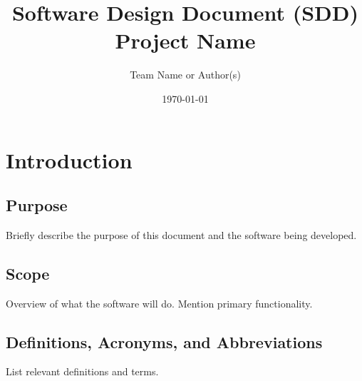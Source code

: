 \documentclass[15pt]{article}
\title{Software Design Document (SDD)\\\large Project Name}
\author{Team Name or Author(s)}
\date{\today}
\begin{document}
\maketitle
\tableofcontents
\newpage

\section{Introduction}
\subsection{Purpose}
Briefly describe the purpose of this document and the software being developed.

\subsection{Scope}
Overview of what the software will do. Mention primary functionality.

\subsection{Definitions, Acronyms, and Abbreviations}
List relevant definitions and terms.
\end{document}
